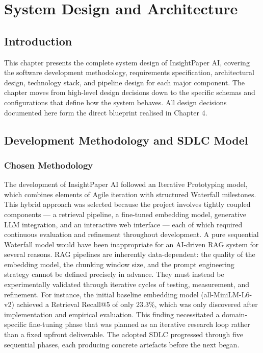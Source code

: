 \chapter{System Design and Architecture}

\section{Introduction}

This chapter presents the complete system design of InsightPaper AI, covering the software development methodology, requirements specification, architectural design, technology stack, and pipeline design for each major component. The chapter moves from high-level design decisions down to the specific schemas and configurations that define how the system behaves. All design decisions documented here form the direct blueprint realised in Chapter 4.

\section{Development Methodology and SDLC Model}

\subsection{Chosen Methodology}

The development of InsightPaper AI followed an Iterative Prototyping model, which combines elements of Agile iteration with structured Waterfall milestones. This hybrid approach was selected because the project involves tightly coupled components — a retrieval pipeline, a fine-tuned embedding model, generative LLM integration, and an interactive web interface — each of which required continuous evaluation and refinement throughout development.
\newline \newline A pure sequential Waterfall model would have been inappropriate for an AI-driven RAG system for several reasons. RAG pipelines are inherently data-dependent: the quality of the embedding model, the chunking window size, and the prompt engineering strategy cannot be defined precisely in advance. They must instead be experimentally validated through iterative cycles of testing, measurement, and refinement. For instance, the initial baseline embedding model (all-MiniLM-L6-v2) achieved a Retrieval Recall@5 of only 23.3\%, which was only discovered after implementation and empirical evaluation. This finding necessitated a domain-specific fine-tuning phase that was planned as an iterative research loop rather than a fixed upfront deliverable.
\newline \newline The adopted SDLC progressed through five sequential phases, each producing concrete artefacts before the next began.

